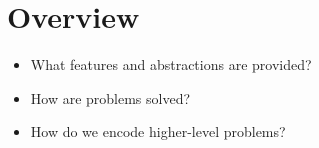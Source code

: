 \section{Overview}

\begin{mytitle}\hfill
\begin{itemize}
    \item What features and abstractions are provided?
    \item How are problems solved?
    \item How do we encode higher-level problems?
\end{itemize}
\end{mytitle}

